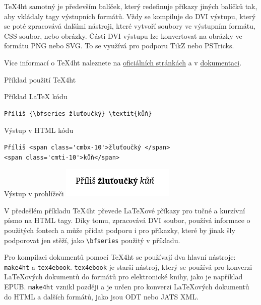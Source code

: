 \TeX4ht samotný je především balíček, který redefinuje příkazy jiných balíčků tak, aby
vkládaly tagy výstupních formátů. Vždy se kompiluje do DVI výstupu, který se poté zpracovává
dalšími nástroji, které vytvoří soubory ve výstupním formátu, CSS soubor, nebo obrázky.
Části DVI výstupu lze konvertovat na obrázky ve formátu PNG nebo SVG. To se využívá pro podporu
TikZ nebo PSTricks.

Více informací o \TeX4ht naleznete na  \href{https://www.tug.org/tex4ht/}{oficiálních stránkách}
a v \href{https://www.kodymirus.cz/tex4ht-doc/tex4ht-doc.html}{dokumentaci}.

\begin{frame}[fragile]{Příklad použití TeX4ht}


\begin{block}{Příklad LaTeX kódu}
\begin{verbatim}
Příliš {\bfseries žluťoučký} \textit{kůň}
\end{verbatim}
\end{block}



\begin{block}{Výstup v HTML kódu}
\begin{verbatim}
Příliš <span class='cmbx-10'>žluťoučký </span>
<span class='cmti-10'>kůň</span>
\end{verbatim}
\end{block}

\begin{block}{Výstup v prohlížeči}
\includegraphics{img/basic.png} 
\end{block}

\end{frame}

V předešlém příkladu \TeX4ht převede LaTeXové příkazy pro tučné a kurzívní písmo na HTML tagy.
Díky tomu, zpracovává DVI soubor, používá informace o použitých fontech a může 
přidat podporu i pro příkazky, které by jinak šly podporovat jen stěží, jako 
\verb|\bfseries| použitý v příkladu.


Pro kompilaci dokumentů pomocí \TeX4ht se používají dva hlavní nástroje: \texttt{make4ht} a \texttt{tex4ebook}.
\texttt{tex4ebook} je starší nástroj, který se používá pro konverzi LaTeXových
dokumentů do formátů pro elektronické knihy, jako je například EPUB.
\texttt{make4ht} vznikl později a je určen pro konverzi LaTeXových dokumentů do
HTML a dalších formátů, jako jsou ODT nebo JATS XML.

